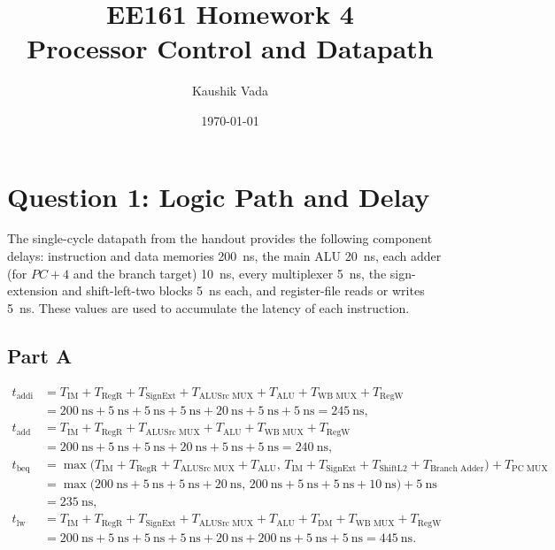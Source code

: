 \documentclass[12pt]{article}
\title{EE161 Homework 4\\Processor Control and Datapath}
\author{Kaushik Vada}
\date{\today}
\begin{document}
\maketitle

\section*{Question 1: Logic Path and Delay}
The single-cycle datapath from the handout provides the following component delays: instruction and data memories \SI{200}{\nano\second}, the main ALU \SI{20}{\nano\second}, each adder (for $PC+4$ and the branch target) \SI{10}{\nano\second}, every multiplexer \SI{5}{\nano\second}, the sign-extension and shift-left-two blocks \SI{5}{\nano\second} each, and register-file reads or writes \SI{5}{\nano\second}. These values are used to accumulate the latency of each instruction.

\subsection*{Part A}
\begin{align*}
  t_{\text{addi}} &= T_{\text{IM}} + T_{\text{RegR}} + T_{\text{SignExt}} + T_{\text{ALUSrc MUX}} + T_{\text{ALU}} + T_{\text{WB MUX}} + T_{\text{RegW}} \\
                  &= \SI{200}{\nano\second} + \SI{5}{\nano\second} + \SI{5}{\nano\second} + \SI{5}{\nano\second} + \SI{20}{\nano\second} + \SI{5}{\nano\second} + \SI{5}{\nano\second} = \SI{245}{\nano\second}, \\
  t_{\text{add}}  &= T_{\text{IM}} + T_{\text{RegR}} + T_{\text{ALUSrc MUX}} + T_{\text{ALU}} + T_{\text{WB MUX}} + T_{\text{RegW}} \\
                  &= \SI{200}{\nano\second} + \SI{5}{\nano\second} + \SI{5}{\nano\second} + \SI{20}{\nano\second} + \SI{5}{\nano\second} + \SI{5}{\nano\second} = \SI{240}{\nano\second}, \\
  t_{\text{beq}}  &= \max\bigl(T_{\text{IM}} + T_{\text{RegR}} + T_{\text{ALUSrc MUX}} + T_{\text{ALU}},\, T_{\text{IM}} + T_{\text{SignExt}} + T_{\text{ShiftL2}} + T_{\text{Branch Adder}}\bigr) + T_{\text{PC MUX}} \\
                  &= \max\bigl(\SI{200}{\nano\second} + \SI{5}{\nano\second} + \SI{5}{\nano\second} + \SI{20}{\nano\second},\, \SI{200}{\nano\second} + \SI{5}{\nano\second} + \SI{5}{\nano\second} + \SI{10}{\nano\second}\bigr) + \SI{5}{\nano\second} \\
                  &= \SI{235}{\nano\second}, \\
  t_{\text{lw}}   &= T_{\text{IM}} + T_{\text{RegR}} + T_{\text{SignExt}} + T_{\text{ALUSrc MUX}} + T_{\text{ALU}} + T_{\text{DM}} + T_{\text{WB MUX}} + T_{\text{RegW}} \\
                  &= \SI{200}{\nano\second} + \SI{5}{\nano\second} + \SI{5}{\nano\second} + \SI{5}{\nano\second} + \SI{20}{\nano\second} + \SI{200}{\nano\second} + \SI{5}{\nano\second} + \SI{5}{\nano\second} = \SI{445}{\nano\second}.
\end{align*}
\end{document}
